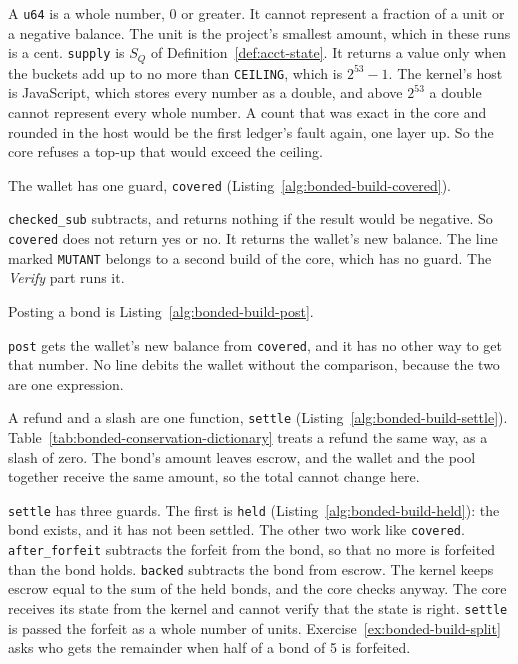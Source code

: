 
A \texttt{u64} is a whole number, 0 or greater. It cannot represent a
fraction of a unit or a negative balance. The unit is the project's
smallest amount, which in these runs is a cent. \texttt{supply} is $S_Q$
of Definition~\ref{def:acct-state}. It returns a value only when the
buckets add up to no more than \texttt{CEILING}, which is $2^{53}-1$. The
kernel's host is JavaScript, which stores every number as a double, and
above $2^{53}$ a double cannot represent every whole number. A count that
was exact in the core and rounded in the host would be the first ledger's
fault again, one layer up. So the core refuses a top-up that would exceed
the ceiling.

The wallet has one guard, \texttt{covered}
(Listing~\ref{alg:bonded-build-covered}).


\texttt{checked\_sub} subtracts, and returns nothing if the result would
be negative. So \texttt{covered} does not return yes or no. It returns the
wallet's new balance. The line marked \texttt{MUTANT} belongs to a second
build of the core, which has no guard. The \emph{Verify} part runs it.

Posting a bond is Listing~\ref{alg:bonded-build-post}.


\texttt{post} gets the wallet's new balance from \texttt{covered}, and it
has no other way to get that number. No line debits the wallet without
the comparison, because the two are one expression.

A refund and a slash are one function, \texttt{settle}
(Listing~\ref{alg:bonded-build-settle}).
Table~\ref{tab:bonded-conservation-dictionary} treats a refund the same
way, as a slash of zero. The bond's amount leaves escrow, and the wallet
and the pool together receive the same amount, so the total cannot change
here.

\texttt{settle} has three guards. The first is \texttt{held}
(Listing~\ref{alg:bonded-build-held}): the bond exists, and it has not
been settled. The other two work like \texttt{covered}.
\texttt{after\_forfeit} subtracts the forfeit from the bond, so that no
more is forfeited than the bond holds. \texttt{backed} subtracts the bond
from escrow. The kernel keeps escrow equal to the sum of the held bonds,
and the core checks anyway. The core receives its state from the kernel
and cannot verify that the state is right. \texttt{settle} is passed the
forfeit as a whole number of units. Exercise~\ref{ex:bonded-build-split}
asks who gets the remainder when half of a bond of 5 is forfeited.

